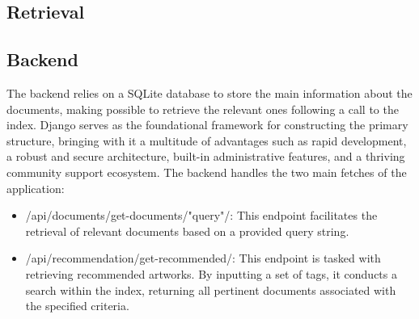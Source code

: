 \documentclass[12pt]{spieman}  %
\begin{document}
\begin{spacing}{1}
    \section{Retrieval}
    \subsection{Backend}
    The backend relies on a SQLite database to store the main information about the documents, making possible to retrieve the relevant ones following a call to the index.\newline
    Django serves as the foundational framework for constructing the primary structure, bringing with it a multitude of advantages such as rapid development, a robust and secure architecture, built-in administrative features, and a thriving community support ecosystem.\newline
    The backend handles the two main fetches of the application:
    \begin{itemize}
        \item /api/documents/get-documents/"query"/: This endpoint facilitates the retrieval of relevant documents based on a provided query string.
        \item /api/recommendation/get-recommended/: This endpoint is tasked with retrieving recommended artworks. By inputting a set of tags, it conducts a search within the index, returning all pertinent documents associated with the specified criteria.
    \end{itemize}


\end{spacing}
\end{document}
